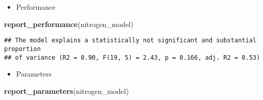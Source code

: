 \documentclass[
]{article}
\newenvironment{Shaded}{\begin{snugshade}}{\end{snugshade}}
\newcommand{\FunctionTok}[1]{\textcolor[rgb]{0.13,0.29,0.53}{\textbf{#1}}}
\newcommand{\NormalTok}[1]{#1}
\providecommand{\tightlist}{%
  \setlength{\itemsep}{0pt}\setlength{\parskip}{0pt}}
\begin{document}
\begin{itemize}
\tightlist
\item
  Performance
\end{itemize}

\begin{Shaded}
\begin{Highlighting}[]
\FunctionTok{report\_performance}\NormalTok{(nitrogen\_model)}
\end{Highlighting}
\end{Shaded}

\begin{verbatim}
## The model explains a statistically not significant and substantial proportion
## of variance (R2 = 0.90, F(19, 5) = 2.43, p = 0.166, adj. R2 = 0.53)
\end{verbatim}

\begin{itemize}
\tightlist
\item
  Parameters
\end{itemize}

\begin{Shaded}
\begin{Highlighting}[]
\FunctionTok{report\_parameters}\NormalTok{(nitrogen\_model)}
\end{Highlighting}
\end{Shaded}
\end{document}
